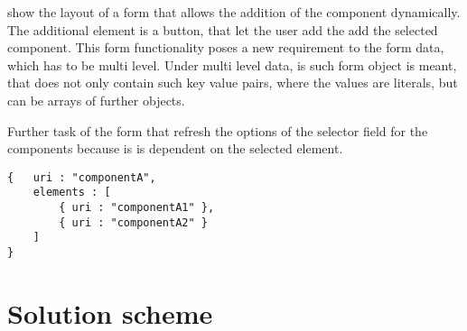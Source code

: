  show the layout of a form that allows the addition of the component dynamically. The additional element is a button, that let the user add the add the selected component.
This form functionality poses a new requirement to the form data, which has to be multi level. Under multi level data, is such form object is meant, that does not only contain such key value pairs, where the values are literals, but can be arrays of further objects. 

Further task of the form that refresh the options of the selector field for the components because is is dependent on the selected element.


\begin{lstlisting}[basicstyle=\footnotesize, frame=single, caption={Multi level form data in JSON}, label=JS_subFormRoutine, captionpos=b, belowskip=1em, aboveskip=2em]
{	uri : "componentA",
	elements : [
		{ uri : "componentA1" },
		{ uri : "componentA2" }
	]
}
\end{lstlisting}

\section{Solution scheme}

